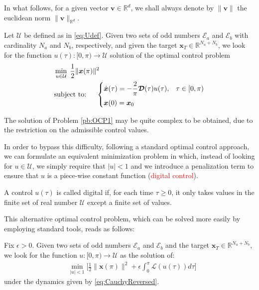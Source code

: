 
In what follows, for a given vector $\bm{v}\in\mathbb{R}^d$, we shall always denote by $\|\bm{v}\|$ the euclidean norm $\|\bm{v}\|_{\mathbb{R}^d}$.
\newline


\begin{problem}\label{pb:OCP1}
Let $\mathcal U$ be defined as in \eqref{eq:Udef}. Given two sets of odd numbers $\mathcal {E}_a $ and $\mathcal {E}_b $ with cardinality $N_a$ and $N_b$, respectively, and given the target $\bm{x}_T\in \mathbb{R}^{N_a+N_b}$, we look for the function $u(\tau):[0,\pi)\to \mathcal U$ solution of the optimal control problem  
\begin{align*}
	&\min_{u \in \mathcal{U}}\;\frac 12 \|\bm{x}(\pi)\|^2
	\\
    &\notag \text{subject to: }\quad \begin{cases}
            \displaystyle \dot{\bm{x}}(\tau) = -\frac 2\pi\bm{\mathcal{D}}(\tau) u(\tau),  & \tau \in [0,\pi)\\[6pt]
            \bm{x}(0) = \bm{x}_0
    \end{cases}
    \end{align*}
\end{problem}
The solution of Problem \ref{pb:OCP1} may be quite complex to be obtained, due to the restriction on the admissible control values. 

In order to bypass this difficulty, following a standard optimal control approach, we can formulate an equivalent minimization problem in which, instead of looking for $u\in\mathcal U$, we simply require that $|u|<1$ and we introduce a penalization term to ensure that $u$ is a piece-wise constant function (\textcolor{red}{digital control}). 

\vspace{0.5em}
\begin{definition}
A control $u(\tau)$ is called digital if, for each time $\tau\geq 0$, it only takes values in the finite set of real number $\mathcal{U}$ except a finite set of values.  
\end{definition}
%
This alternative optimal control problem, which can be solved more easily by employing standard tools, reads as follows:
\newline
\begin{problem}\label{pb:OCP2}
Fix $\epsilon>0$. Given two sets of odd numbers $\mathcal E_a $ and $\mathcal E_b $ and the target $\bm{x}_T \in \mathbb {R}^{N_a + N_b}$, we look for the  function $u:[0,\pi)\to\mathcal U$ as the solution of:
\begin{align*}
	&\min_{|u|<1} \Bigg[\frac 12 \|\bm{x}(\pi) \|^2+ \epsilon \int_0^{\pi} \mathcal{L}(u(\tau)) d\tau \Bigg]  
\end{align*}
under the dynamics given by \eqref{eq:CauchyReversed}.
\end{problem}

